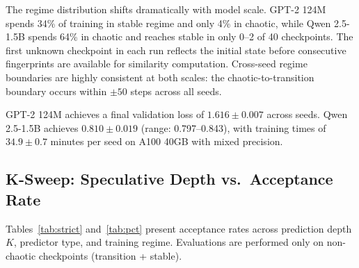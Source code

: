 \documentclass{article}
\begin{document}
The regime distribution shifts dramatically with model scale.
GPT-2 124M spends 34\% of training in stable regime and only 4\% in chaotic, while Qwen 2.5-1.5B spends 64\% in chaotic and reaches stable in only 0--2 of 40 checkpoints.
The first unknown checkpoint in each run reflects the initial state before consecutive fingerprints are available for similarity computation.
Cross-seed regime boundaries are highly consistent at both scales: the chaotic-to-transition boundary occurs within $\pm 50$ steps across all seeds.

GPT-2 124M achieves a final validation loss of $1.616 \pm 0.007$ across seeds.
Qwen 2.5-1.5B achieves $0.810 \pm 0.019$ (range: 0.797--0.843), with training times of $34.9 \pm 0.7$ minutes per seed on A100 40GB with mixed precision.

\subsection{K-Sweep: Speculative Depth vs.\ Acceptance Rate}
\label{sec:results:ksweep}

Tables~\ref{tab:strict} and~\ref{tab:pct} present acceptance rates across prediction depth $K$, predictor type, and training regime.
Evaluations are performed only on non-chaotic checkpoints (transition + stable).
\end{document}
